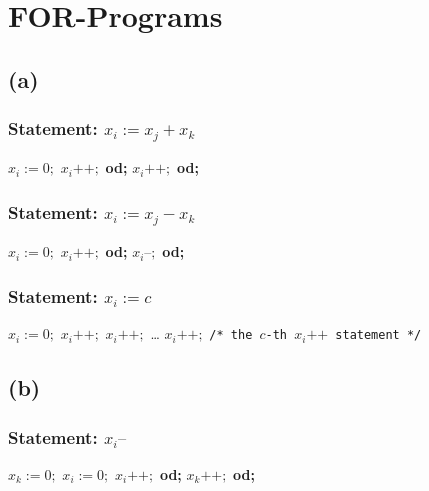 \documentclass{article}
\begin{document}
\section*{FOR-Programs}

\subsection*{(a)}
\subsubsection*{Statement: \( x_i := x_j + x_k \)}
\label{alg:addition}

\begin{algorithmic}[1]
\State \( x_i := 0; \)
    \State \( x_i \texttt{++}; \)
\EndFor \textbf{od;}
    \State \( x_i \texttt{++}; \)
\EndFor \textbf{od;}
\end{algorithmic}

\subsubsection*{Statement: \( x_i := x_j - x_k \)}
\label{alg:subtraction}

\begin{algorithmic}[1]
\State \( x_i := 0; \)
    \State \( x_i \texttt{++}; \)
\EndFor \textbf{od;}
    \State \( x_i \texttt{--}; \)
\EndFor \textbf{od;}
\end{algorithmic}

\subsubsection*{Statement: \( x_i := c \)}
\label{alg:equality}

\begin{algorithmic}[1]
\State \( x_i := 0; \)
\State \( x_i \texttt{++}; \)
\State \( x_i \texttt{++}; \)
\State \dots
\State \( x_i \texttt{++}; \) \texttt{/* the \( c \)-th \( x_i \texttt{++} \) statement */}
\end{algorithmic}


\subsection*{(b)}
\subsubsection*{Statement: \( x_i \texttt{--} \)}

\label{alg:decrement}

\begin{algorithmic}[1]
\State \( x_k := 0; \)
    \State \( x_i := 0; \)
        \State \( x_i \texttt{++}; \)
    \EndFor \textbf{od;}
    \State \( x_k \texttt{++}; \)
\EndFor \textbf{od;}
\end{algorithmic}
\end{document}
